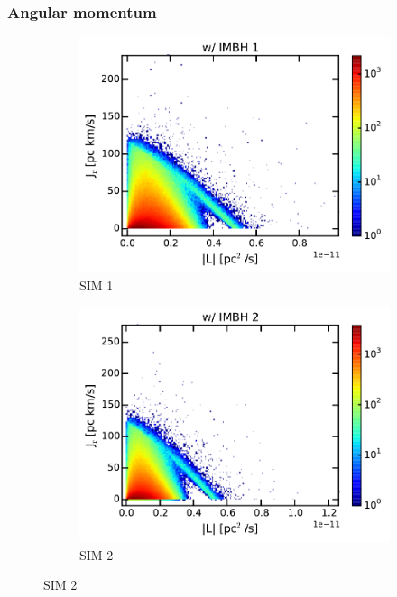 \subsubsection{Angular momentum}
\begin{figure}[htbp]
\centering
	\begin{subfigure}{0.475\textwidth}
		\includegraphics[width=\textwidth]{Plots/L_J_r_hist_IMBH1.pdf}
		\caption{SIM 1}
		\label{fig:L_J_r_hist_IMBH1}
	\end{subfigure}
	\hfill
	\begin{subfigure}{0.475\textwidth}
		\includegraphics[width=\textwidth]{Plots/L_J_r_hist_IMBH2.pdf}
		\caption{SIM 2}
		\label{fig:L_J_r_hist_IMBH2}
	\end{subfigure}

\end{figure}
